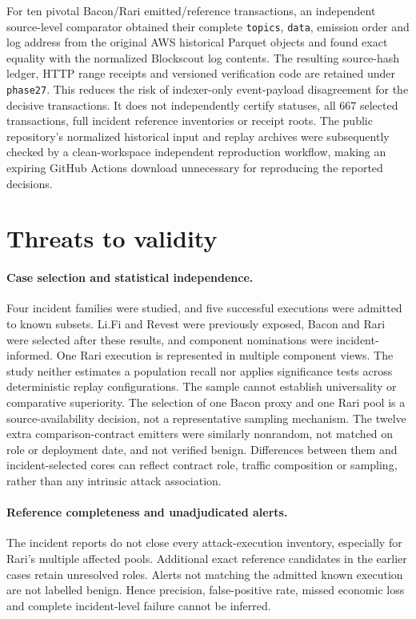 \documentclass[preprint,12pt,authoryear]{elsarticle}
\begin{document}
For ten pivotal Bacon/Rari emitted/reference transactions, an independent source-level comparator obtained their complete \texttt{topics}, \texttt{data}, emission order and log address from the original AWS historical Parquet objects and found exact equality with the normalized Blockscout log contents. The resulting source-hash ledger, HTTP range receipts and versioned verification code are retained under \texttt{phase27}. This reduces the risk of indexer-only event-payload disagreement for the decisive transactions. It does not independently certify statuses, all 667 selected transactions, full incident reference inventories or receipt roots. The public repository's normalized historical input and replay archives were subsequently checked by a clean-workspace independent reproduction workflow, making an expiring GitHub Actions download unnecessary for reproducing the reported decisions.

\section{Threats to validity}\label{sec:validity}

\paragraph{Case selection and statistical independence.} Four incident families were studied, and five successful executions were admitted to known subsets. Li.Fi and Revest were previously exposed, Bacon and Rari were selected after these results, and component nominations were incident-informed. One Rari execution is represented in multiple component views. The study neither estimates a population recall nor applies significance tests across deterministic replay configurations. The sample cannot establish universality or comparative superiority. The selection of one Bacon proxy and one Rari pool is a source-availability decision, not a representative sampling mechanism. The twelve extra comparison-contract emitters were similarly nonrandom, not matched on role or deployment date, and not verified benign. Differences between them and incident-selected cores can reflect contract role, traffic composition or sampling, rather than any intrinsic attack association.

\paragraph{Reference completeness and unadjudicated alerts.} The incident reports do not close every attack-execution inventory, especially for Rari's multiple affected pools. Additional exact reference candidates in the earlier cases retain unresolved roles. Alerts not matching the admitted known execution are not labelled benign. Hence precision, false-positive rate, missed economic loss and complete incident-level failure cannot be inferred.
\end{document}
